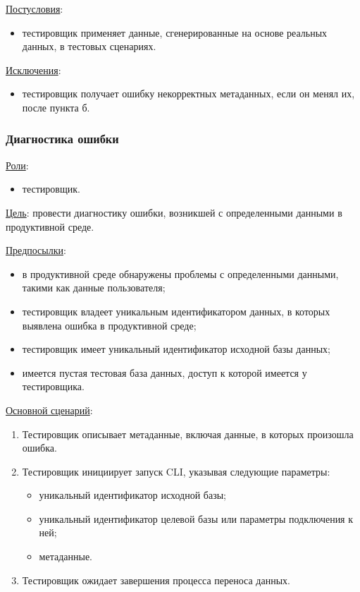 \underline{Постусловия}:

\begin{itemize}
    \item тестировщик применяет данные, сгенерированные на основе реальных данных, в тестовых сценариях.
\end{itemize}

\underline{Исключения}:

\begin{itemize}
    \item тестировщик получает ошибку некорректных метаданных, если он менял их, после пункта б.
\end{itemize}


\subsubsection{Диагностика ошибки}

\underline{Роли}:

\begin{itemize}
    \item тестировщик.
\end{itemize}

\underline{Цель}: провести диагностику ошибки, возникшей с определенными данными в продуктивной среде.

\underline{Предпосылки}:

\begin{itemize}
    \item в продуктивной среде обнаружены проблемы с определенными данными, такими как данные пользователя;
    \item тестировщик владеет уникальным идентификатором данных, в которых выявлена ошибка в продуктивной среде;
    \item тестировщик имеет уникальный идентификатор исходной базы данных;
    \item имеется пустая тестовая база данных, доступ к которой имеется у тестировщика.
\end{itemize}

\underline{Основной сценарий}:

\begin{enumerate}
    \item Тестировщик описывает метаданные, включая данные, в которых произошла ошибка.
    \item Тестировщик инициирует запуск CLI, указывая следующие параметры:
    \begin{itemize}
        \item уникальный идентификатор исходной базы;
        \item уникальный идентификатор целевой базы или параметры подключения к ней;
        \item метаданные.
    \end{itemize}
    \item Тестировщик ожидает завершения процесса переноса данных.
\end{enumerate}

